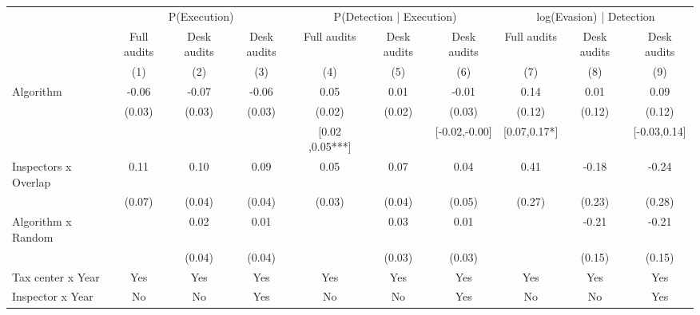 \begin{tabular}{lccc|ccc|ccc} \toprule
\multicolumn{1}{l}{} & \multicolumn{3}{c}{P(Execution)} & \multicolumn{3}{c}{P(Detection | Execution)} & \multicolumn{3}{c}{log(Evasion) | Detection} \\\cmidrule(lr){2-4}\cmidrule(lr){5-7}\cmidrule(lr){8-10} \multicolumn{1}{l}{} & Full audits & Desk audits & Desk audits & Full audits & Desk audits & Desk audits & Full audits & Desk audits & Desk audits \\ \multicolumn{1}{l}{} & (1) & (2) & (3) & (4) & (5) & (6) & (7) & (8) & (9) \\ \midrule
Algorithm   &       -0.06\sym{*}  &       -0.07\sym{***}&       -0.06\sym{**} &        0.05\sym{**} &        0.01         &       -0.01         &        0.14         &        0.01         &        0.09         \\
            &      (0.03)         &      (0.03)         &      (0.03)         &      (0.02)         &      (0.02)         &      (0.03)         &      (0.12)         &      (0.12)         &      (0.12)         \\
\addlinespace
 & & & & [0.02 ,0.05***] & & [-0.02,-0.00] & [0.07,0.17*] & & [-0.03,0.14] \\  Inspectors x Overlap&        0.11\sym{*}  &        0.10\sym{**} &        0.09\sym{**} &        0.05\sym{*}  &        0.07\sym{**} &        0.04         &        0.41         &       -0.18         &       -0.24         \\
            &      (0.07)         &      (0.04)         &      (0.04)         &      (0.03)         &      (0.04)         &      (0.05)         &      (0.27)         &      (0.23)         &      (0.28)         \\
\addlinespace
Algorithm x Random&                     &        0.02         &        0.01         &                     &        0.03         &        0.01         &                     &       -0.21         &       -0.21         \\
            &                     &      (0.04)         &      (0.04)         &                     &      (0.03)         &      (0.03)         &                     &      (0.15)         &      (0.15)         \\
\midrule
Tax center x Year&         Yes         &         Yes         &         Yes         &         Yes         &         Yes         &         Yes         &         Yes         &         Yes         &         Yes         \\
Inspector x Year&          No         &          No         &         Yes         &          No         &          No         &         Yes         &          No         &          No         &         Yes         \\

\end{tabular}
